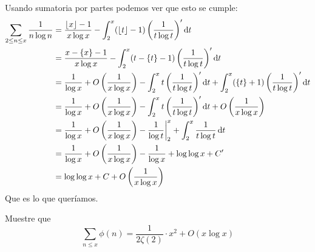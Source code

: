 \begin{sol}
    Usando sumatoria por partes podemos ver que esto se cumple:
    \begin{align*}
        \sum_{2\leq n\leq x}\frac{1}{n\log n}&=\frac{\lfloor x\rfloor-1}{x\log x}-\int_2^x(\lfloor t\rfloor - 1) \left(\frac{1}{t\log t}\right)'\operatorname{d}\!{t}\\
        &=\frac{x-\{x\}-1}{x\log x}-\int_2^x (t-\{t\} - 1) \left(\frac{1}{t\log t}\right)'\operatorname{d}\!{t}\\
        &=\frac{1}{\log x}+O\left(\frac{1}{x\log x}\right)-\int_2^x t \left(\frac{1}{t\log t}\right)'\operatorname{d}\!{t}+\int_2^x (\{t\} + 1)\left(\frac{1}{t\log t}\right)'\operatorname{d}\!{t}\\
        &=\frac{1}{\log x}+O\left(\frac{1}{x\log x}\right)-\int_2^x t \left(\frac{1}{t\log t}\right)'\operatorname{d}\!{t}+O\left(\frac{1}{x\log x}\right)\\
        &=\frac{1}{\log x}+O\left(\frac{1}{x\log x}\right)-\frac{1}{\log t}\bigg\rvert_2^x+\int_2^x \frac{1}{t\log t}\operatorname{d}\!{t}\\
        &=\frac{1}{\log x}+O\left(\frac{1}{x\log x}\right)-\frac{1}{\log x}+\log\log x+C'\\
        &=\log\log x+C+O\left(\frac{1}{x\log x}\right)
    \end{align*}
    Que es lo que queríamos.
\end{sol}

\begin{prob}[4 pts.]
	Muestre que
	\[\sum_{n\leq x}\phi(n)=\frac{1}{2\zeta(2)}\cdot x^2+O(x\log x)\]
\end{prob}

